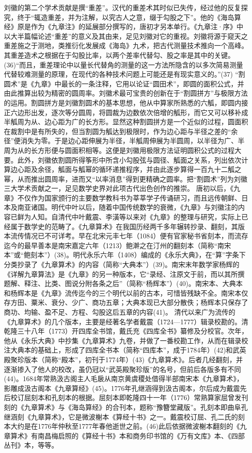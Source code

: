 \documentclass[12pt,UTF8]{ctexbook}
\begin{document}
刘徽的第二个学术贡献是撰“重差”。汉代的重差术其时似已失传，经过他的反复探究，终于“辄造重差，并为注解，以究古人之意，缀于勾股之下”。他的《海岛算经》原是作为《九章注》的延展部分撰写的，唐初才另本单行。《九章注·序》中以大半篇幅论述“重差”的意义及其由来，足见刘徽对它的重视。刘徽将源于窥天之重差施之于测地，类推衍化发展成《海岛》九术，把古代测量技术推向一个高峰。其重差造术之根据在于勾股比率，以两个差率代替勾、股之率是其中的关键。(36)“而且，重差理论中以量长代替角的测量的这一方法所隐含的以多次简易测量代替较难测量的原理，在现代的各种技术问题上可能还是有现实意义的。”(37)
“割圆术”是《九章》中最长的一条注释，它用以论证“圆田术”，即圆的面积公式，并由此推算出较为精密的圆周率。刘徽术最可宝贵的创新在于“割圆拼方”与极限方法的运用。割圆拼方是刘徽割圆术的基本思想，他从中算家所熟悉的六觚，即圆内接正六边形出发，逐次等分圆周，将圆裁为边数依次倍增的觚形，而它又可以移补成半觚周为从、边心距为广的长方形。显然这种割圆拼方是一个近似的过程，圆面积在裁割中是有所失的，但当割圆为觚达到极限时，作为边心距与半径之差的“余径”便消失为零。于是边心距伸展为半径，半觚周伸展为半圆周，以半径为广、半周为从的长方形便与圆面积相等。这便是刘徽用极限方法证明圆积公式的过程大要。此外，刘徽依割圆所得筝形中所含小勾股弦与圆径、觚面之关系，列出依次计算边心距及余径，觚面与觚幂的循环递推程序，并由此逐步算得一百九十二觚之幂，从而推出圆周率，进而又“以率消息”得到更精确之圆率。把“割圆术”列为刘徽三大学术贡献之一，足见数学史界对此项古代出色创作的推崇。
唐初以后，《九章》不仅作为国家颁行的主要数学教科书为莘莘学子传诵研习，而且远传朝鲜、日本及南亚诸国。明代中叶以后，随着中国传统数学的衰微，《九章》与刘徽注的内容已鲜为人知。自清代中叶戴震、李潢等以来对《九章》的整理与研究，实际上已经属于数学史的范畴了。《九章算术》在我国历经两千多年辗转抄录、翻刻，其版本流传情况已不可详考。早在北宋元丰七年（1084）便有官家秘书省刻本，而流存迄今的最早善本是南宋嘉定六年（1213）鲍澣之在汀州的翻刻本（简称“南宋本”或“鲍刻本”）(38)。明代永乐六年（1408）编成的《永乐大典》，在“算”字条下分类抄录了《九章算术》的内容（简称“大典本”）(39)。南宋末年数学家杨辉的《详解九章算法》是《九章》的另一种版本，它“录经、注原文于前，而以其所撰题解、释注、比类、图说分附各条之后”（简称“杨辉本”）(40)。南宋本、大典本和杨辉本是《九章》流传迄今的三个明代以前的古本，可惜皆残缺不全。南宋本仅存方田、粟米、衰分、少广、商功五章；大典本现已大部分散佚；杨辉本只保存了商功、均输、盈不足、方程、勾股这后五章的内容(41)。
清代以来广为流传的《九章算术》的几个版本，主要是经著名学者戴震（1724—1777）辑录校勘的。清乾隆三十八年（1773）开四库全书馆，戴氏充《四库全书》纂修及分校官。次年，他从《永乐大典》中抄集《九章算术》九卷，并做了一番校勘工作，从而在辑录校注大典本的基础上，形成了四库全书本（简称“四库本”，成于1784年）(42)和武英殿聚珍版本（简称“殿本”，初刊于1774年）(43)《九章算术》。后者几经翻刻，并逐渐掺入了他人的校改，虽仍冠以“武英殿聚珍版”的名号，但前后各版多有不同(44)。1684年常熟汲古阁主人毛扆从南京黄虞稷处借得半部南宋本《九章算术》，影雕成汲古阁本《九章算经》(45)。1776年孔继涵得到汲古阁本，尔后成为戴震先后校订屈刻本和孔刻本的根据。屈刻本即乾隆四十一年（1776）常熟算家屈曾发刊刻的《九章算术》与《海岛算经》的合刊本，题称“豫簪堂藏版”。孔刻本即曲阜孔继涵刻《九章算术》，它是微波榭本《算经十书》之一。戴震校订屈、孔二氏的刻本大约是在1776年仲秋至1777年春他逝世之前。(46)此后依据微波榭本翻刻的《九章算术》有南昌梅启照的《算经十书》本和商务印书馆的《万有文库》本、《四部丛刊》本，等等。
\end{document}
